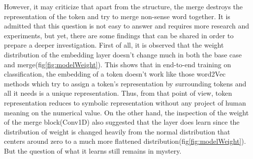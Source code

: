 \documentclass[12pt]{article}
\begin{document}
However, it may criticize that apart from the structure, the merge destroys the representation of the token and try to merge non-sense word together. It is admitted that this question is not easy to answer and requires more research and experiments, but yet, there are some findings that can be shared in order to prepare a deeper investigation. First of all, it is observed that the weight distribution of the embedding layer doesn't change much\label{context:embeddoesntchange} in both the base case and merge(fig\ref{fig:modelWeight}). This shows that in end-to-end training on classification, the embedding of a token doesn't work like those word2Vec methods which try to assign a token's representation by surrounding tokens and all it needs is a unique representation. Thus, from that point of view, token representation reduces to symbolic representation without any project of human meaning on the numerical value. On the other hand, the inspection of the weight of the merge block(Conv1D) also suggested that the layer does learn since the distribution of weight is changed heavily from the normal distribution that centers around zero to a much more flattened distribution(fig\ref{fig:modelWeight}). But the question of what it learns still remains in mystery. \\
\end{document}
